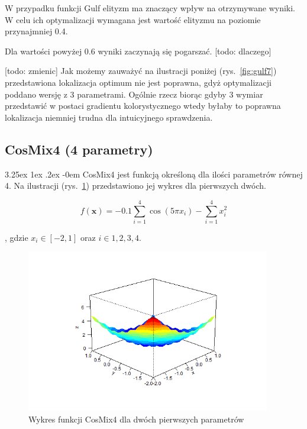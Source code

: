 \documentclass[11pt, a4paper]{article}
\makeatletter
\newcommand{\fbi}{\leavevmode{\parindent=1em\indent}}
\renewcommand\paragraph{\@startsection{paragraph}{5}{\z@}
  {3.25ex \@plus1ex \@minus.2ex}
  {-0em}
  {\normalfont\normalsize\bfseries}}
\makeatother
\begin{document}
\fbi
W przypadku funkcji Gulf elityzm ma znaczący wpływ na otrzymywane wyniki. W celu ich optymalizacji wymagana jest wartość elityzmu na poziomie przynajmniej 0.4.

\fbi
Dla wartości powyżej 0.6 wyniki zaczynają się pogarszać. [todo: dlaczego]


\fbi
[todo: zmienic]
Jak możemy zauważyć na ilustracji poniżej (rys.~\ref{fig:gulf7}) przedstawiona lokalizacja optimum nie jest poprawna, gdyż optymalizacji poddano wersję z 3 parametrami. Ogólnie rzecz biorąc gdyby 3 wymiar przedstawić w postaci gradientu kolorystycznego wtedy byłaby to poprawna lokalizacja niemniej trudna dla intuicyjnego sprawdzenia.

\newpage
\subsection{CosMix4 (4 parametry)}
\paragraph{}
CosMix4 jest funkcją określoną dla ilości parametrów równej 4. Na ilustracji (rys.~\ref{fig:cosmix41}) przedstawiono jej wykres dla pierwszych dwóch.

\begin{equation}\label{eq:cosmix4}
f(\boldsymbol{x}) = -0.1 \sum_{i=1}^{4} \cos (5 \pi x_i) - \sum_{i=1}^{4} x_i^2
\end{equation}

, gdzie $ x_i \in [-2, 1] $ oraz $ i \in {1,2,3,4} $.

\begin{figure}[H]
	\begin{center}
		\includegraphics[width=0.95\textwidth]{./assets/CosMix41.png}
		\caption{Wykres funkcji CosMix4 dla dwóch pierwszych parametrów}
		\label{fig:cosmix41}
	\end{center}
\end{figure}
\end{document}
